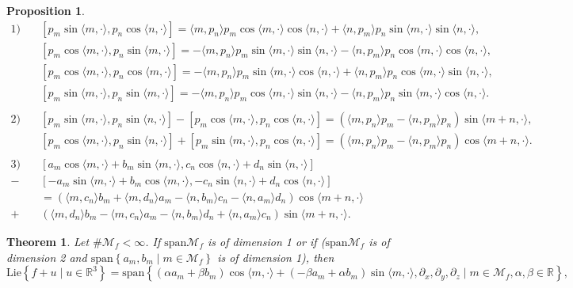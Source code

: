 \documentclass[10pt,a4paper]{amsart}
\newtheorem{prop}{Proposition}
\newtheorem{theorem}{Theorem}
\newcommand{\M}{{\mathcal M}}
\newcommand{\R}{{\mathbb R}}
\newcommand{\la}{\langle}
\newcommand{\p}{\partial}
\newcommand{\ra}{\rangle}
\begin{document}
\begin{prop} \label{formulas T3}
\begin{align*}
    1)\quad &[p_m\sin\la m,\cdot \ra,p_n\cos \la n,\cdot \ra]=\la m,p_n\ra p_m\cos \la m,\cdot \ra \cos \la n,\cdot\ra +\la n,p_m\ra p_n\sin \la m,\cdot \ra \sin \la n,\cdot \ra,  \\
    &[p_m\cos \la m,\cdot \ra,p_n \sin \la m,\cdot \ra]=-\la m,p_n\ra p_m\sin \la m,\cdot \ra \sin \la n,\cdot\ra -\la n,p_m\ra p_n\cos \la m,\cdot \ra \cos \la n,\cdot \ra, \\
    &[p_m\cos \la m,\cdot \ra,p_n \cos \la m,\cdot \ra]=-\la m,p_n\ra p_m\sin \la m,\cdot \ra \cos \la n,\cdot\ra +\la n,p_m\ra p_n\cos \la m,\cdot \ra \sin \la n,\cdot \ra, \\
    &[p_m\sin \la m,\cdot \ra,p_n \sin \la m,\cdot \ra]=-\la m,p_n\ra p_m\cos \la m,\cdot \ra \sin \la n,\cdot\ra -\la n,p_m\ra p_n\sin \la m,\cdot \ra \cos \la n,\cdot \ra. \\ \\
    2)\quad &[p_m\sin \la m,\cdot \ra,p_n\sin\la n,\cdot\ra ]-[p_m\cos \la m,\cdot \ra,p_n\cos \la n,\cdot \ra ]
    =(\la m,p_n\ra p_m - \la n,p_m\ra p_n)\sin \la m+n,\cdot \ra,\\
    &[p_m\cos \la m,\cdot \ra,p_n\sin\la n,\cdot\ra ]+[p_m\sin \la m,\cdot \ra,p_n\cos \la n,\cdot \ra ]
    =(\la m,p_n\ra p_m - \la n,p_m\ra p_n)\cos \la m+n,\cdot \ra.\\ \\
    3) \quad &[a_m\cos\la m,\cdot \ra+b_m\sin \la m,\cdot \ra,c_n\cos \la n,\cdot \ra+d_n \sin \la n,\cdot \ra]\\
        -&[-a_m\sin\la m,\cdot \ra+b_m\cos \la m,\cdot \ra,-c_n\sin \la n,\cdot \ra+d_n \cos \la n,\cdot \ra]\\
        &=(\la m,c_n\ra b_m+\la m,d_n\ra a_m- \la n,b_m \ra c_n - \la n,a_m \ra d_n)\cos \la m+n,\cdot \ra \\
        +&(\la m,d_n\ra b_m-\la m,c_n \ra a_m -\la n,b_m \ra d_n+\la n,a_m \ra c_n)\sin \la m+n,\cdot \ra.
    \end{align*}
\end{prop}

\begin{theorem} \label{theorem : appendix T3 span1}
     Let $\# \M_f < \infty$. If $\mathrm{span}\M_f$ is of dimension 1 or if ($\mathrm{span}\M_f$ is of dimension 2 and $\mathrm{span}\left\{a_m,b_m \mid m \in \M_f\right\}$ is of dimension 1), then 
        \begin{equation*}
            \mathrm{Lie}\left\{f+u \mid u \in \R^3\right\}=\mathrm{span}\left\{(\alpha a_m + \beta b_m)\cos \la m,\cdot \ra + (-\beta a_m + \alpha b_m)\sin \la m,\cdot \ra,\p_x,\p_y,\p_z \mid m\in \M_f, \alpha,\beta \in \R\right\},
        \end{equation*}
\end{theorem}
\end{document}
